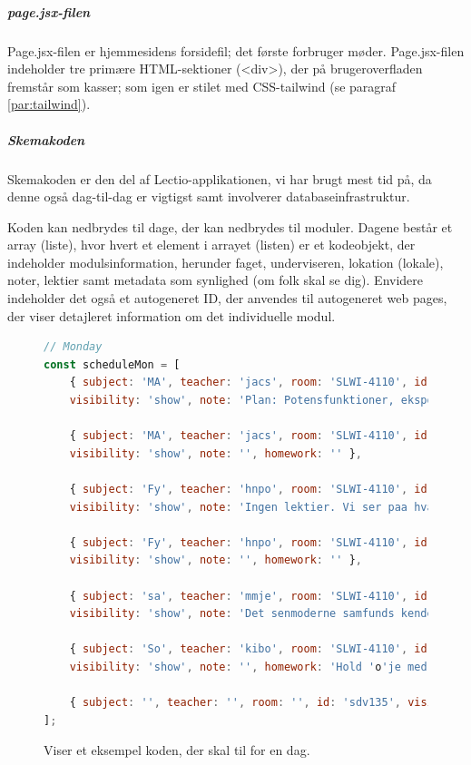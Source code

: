             \subparagraph{page.jsx-filen}
            Page.jsx-filen er hjemmesidens forsidefil; det første forbruger møder. Page.jsx-filen indeholder tre primære HTML-sektioner (<div>), der på brugeroverfladen fremstår som kasser; som igen er stilet med CSS-tailwind (se paragraf \ref{par:tailwind}).

            \subparagraph{Skemakoden}
            Skemakoden er den del af Lectio-applikationen, vi har brugt mest tid på, da denne også dag-til-dag er vigtigst samt involverer databaseinfrastruktur. 
            
            Koden kan nedbrydes til dage, der kan nedbrydes til moduler. Dagene består et array (liste), hvor hvert et element i arrayet (listen) er et kodeobjekt, der indeholder modulsinformation, herunder faget, underviseren, lokation (lokale), noter, lektier samt metadata som synlighed (om folk skal se dig). Envidere indeholder det også et autogeneret ID, der anvendes til autogeneret web pages, der viser detajleret information om det individuelle modul.
            \begin{figure}[H]
                \begin{lstlisting}[language=Javascript]
// Monday
const scheduleMon = [
    { subject: 'MA', teacher: 'jacs', room: 'SLWI-4110', id: '1fxh', 
    visibility: 'show', note: 'Plan: Potensfunktioner, eksponentiel vaekst', homework: '03_opg_polynomier.ipynb' },
    
    { subject: 'MA', teacher: 'jacs', room: 'SLWI-4110', id: '123afa', 
    visibility: 'show', note: '', homework: '' },
    
    { subject: 'Fy', teacher: 'hnpo', room: 'SLWI-4110', id: 'qw123ac', 
    visibility: 'show', note: 'Ingen lektier. Vi ser paa hvad vi skal i timen. Forberedelse til SO2 i naeste uge. we  we jwnkjnkjn kjnkjnkjn ', homework: '' },
    
    { subject: 'Fy', teacher: 'hnpo', room: 'SLWI-4110', id: 'xcv12', 
    visibility: 'show', note: '', homework: '' },
    
    { subject: 'sa', teacher: 'mmje', room: 'SLWI-4110', id: 'sdvf23', 
    visibility: 'show', note: 'Det senmoderne samfunds kendetegn ', homework: '' },
    
    { subject: 'So', teacher: 'kibo', room: 'SLWI-4110', id: 'sdf123', 
    visibility: 'show', note: '', homework: 'Hold 'o'je med, hvordan du tager noter i de forskellige fag.' },
    
    { subject: '', teacher: '', room: '', id: 'sdv135', visibility: 'hide', note: '', homework: '' },
];
                \end{lstlisting}
                \caption{Viser et eksempel koden, der skal til for en dag. \label{fig:dataeksempel}}
            \end{figure}

